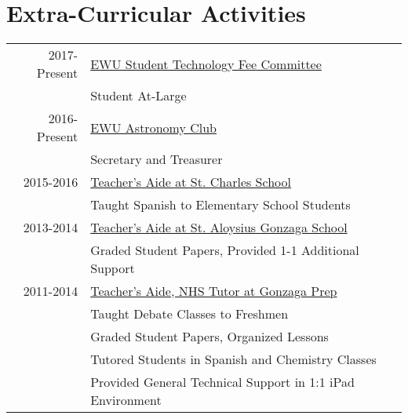 \documentclass[]{deedy-resume-openfont}
\begin{document}
\begin{minipage}[t]{0.66\textwidth}
\section{Extra-Curricular Activities} 
\begin{tabular}{rll}
2017-Present & \underline{EWU Student Technology Fee Committee}\\
 & Student At-Large\\
2016-Present & \underline{EWU Astronomy Club} \\
 & Secretary and Treasurer\\
2015-2016 & \underline{Teacher's Aide at St. Charles School} \\
 & Taught Spanish to Elementary School Students\\
2013-2014 & \underline{Teacher's Aide at St. Aloysius Gonzaga School} \\
 & Graded Student Papers, Provided 1-1 Additional Support\\
2011-2014 & \underline{Teacher's Aide, NHS Tutor at Gonzaga Prep}\\
 & Taught Debate Classes to Freshmen\\
 & Graded Student Papers, Organized Lessons\\
 & Tutored Students in Spanish and Chemistry Classes\\
 & Provided General Technical Support in 1:1 iPad Environment\\

\end{tabular}
\sectionsep

\end{minipage} 
\end{document}
